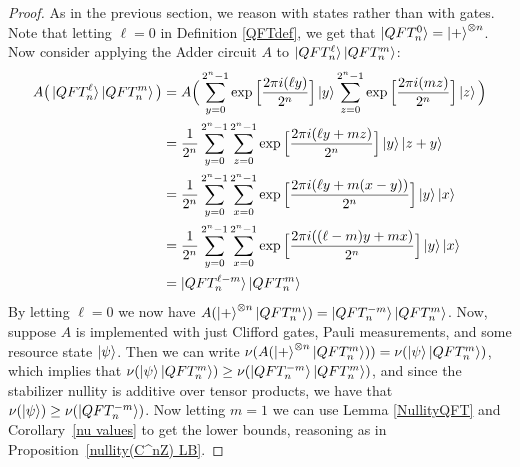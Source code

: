 \documentclass[12pt]{dalthesis}
\begin{document}
\begin{proof}
  As in the previous section, we reason with states rather than with gates. Note that letting $\ell=0$ in Definition \ref{QFTdef}, we get that $\ket{QFT_n^0} = \ket{+}^{\otimes n}$. Now consider applying the Adder circuit $A$ to $\ket{QFT_n^\ell} \ket{QFT_n^m}$:
\begin{equation}
\begin{split}
A \big(\ket{QFT_n^\ell} \ket{QFT_n^m} \big) 
& = A \Big( \sum\limits_{y=0}^{2^n-1} \exp \Big[ \frac{2 \pi i (\ell y)}{2^n} \Big] \ket{y} \sum\limits_{z=0}^{2^n-1} \exp \Big[ \frac{2 \pi i (mz)}{2^n} \Big] \ket{z}  \Big) \\
& = \frac{1}{2^n} \sum\limits_{y=0}^{2^n-1} \sum\limits_{z=0}^{2^n-1} \exp \Big[ \frac{2 \pi i (\ell y + mz)}{2^n} \Big] \ket{y}\ket{z+y} \\
& = \frac{1}{2^n} \sum\limits_{y=0}^{2^n-1} \sum\limits_{x=0}^{2^n-1} \exp \Big[ \frac{2 \pi i (\ell y + m(x-y))}{2^n} \Big] \ket{y}\ket{x} \\
& = \frac{1}{2^n} \sum\limits_{y=0}^{2^n-1} \sum\limits_{x=0}^{2^n-1} \exp \Big[ \frac{2 \pi i ((\ell -m)y + mx)}{2^n} \Big] \ket{y}\ket{x} \\
& = \ket{QFT_n^{\ell -m}}\ket{QFT_n^m}
\end{split}
\end{equation}
By letting $\ell = 0$ we now have $A(\ket{+}^{\otimes n} \ket{QFT_n^m}) = \ket{QFT_n^{-m}}\ket{QFT_n^m}$. Now, suppose $A$ is implemented with just Clifford gates, Pauli measurements, and some resource state $\ket{\psi}$. Then we can write $\nu(A(\ket{+}^{\otimes n} \ket{QFT_n^m})) = \nu (\ket{\psi} \ket{QFT_n^m})$, which implies that $\nu (\ket{\psi} \ket{QFT_n^m}) \geq \nu(\ket{QFT_n^{-m}} \ket{QFT_n^m})$, and since the stabilizer nullity is additive over tensor products, we have that $\nu (\ket{\psi}) \geq \nu(\ket{QFT_n^{-m}})$. Now letting $m=1$ we can use Lemma \ref{NullityQFT} and Corollary~\ref{nu values} to get the lower bounds, reasoning as in Proposition~\ref{nullity(C^nZ) LB}. \qedhere
  
  
  

\end{proof}
\end{document}
